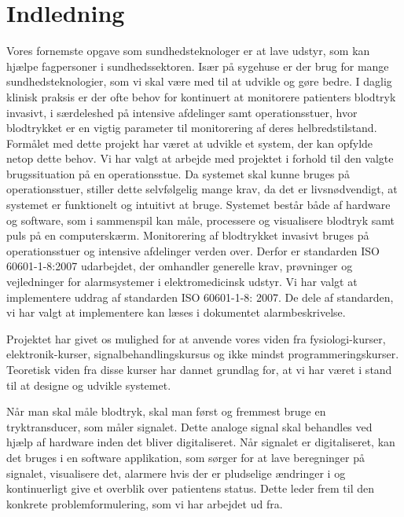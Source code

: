\chapter{Indledning}
Vores fornemste opgave som sundhedsteknologer er at lave udstyr, som kan hjælpe fagpersoner
i sundhedssektoren. Især på sygehuse er der brug for mange sundhedsteknologier, som vi
skal være med til at udvikle og gøre bedre. I daglig klinisk praksis er der ofte behov for
kontinuert at monitorere patienters blodtryk invasivt, i særdeleshed på intensive afdelinger
samt operationsstuer, hvor blodtrykket er en vigtig parameter til monitorering af deres
helbredstilstand. Formålet med dette projekt har været at udvikle et system, der kan opfylde
netop dette behov. Vi har valgt at arbejde med projektet i forhold til den valgte brugssituation
på en operationsstue. Da systemet skal kunne bruges på operationsstuer, stiller dette selvfølgelig
mange krav, da det er livsnødvendigt, at systemet er funktionelt og intuitivt at bruge. Systemet
består både af hardware og software, som i sammenspil kan måle, processere og visualisere blodtryk
samt puls på en computerskærm. Monitorering af blodtrykket invasivt bruges på operationsstuer
og intensive afdelinger verden over. Derfor er standarden ISO 60601-1-8:2007 udarbejdet, der omhandler generelle krav, prøvninger og vejledninger for alarmsystemer i elektromedicinsk udstyr. 
Vi har valgt at implementere uddrag af standarden ISO 60601-1-8: 2007. De dele af standarden, vi har valgt at implementere kan læses i dokumentet alarmbeskrivelse. 

Projektet har givet os mulighed for at anvende vores viden fra fysiologi-kurser, elektronik-kurser,
signalbehandlingskursus og ikke mindst programmeringskurser. Teoretisk viden fra disse kurser
har dannet grundlag for, at vi har været i stand til at designe og udvikle systemet.

Når man skal måle blodtryk, skal man først og fremmest bruge en tryktransducer, som
måler signalet. Dette analoge signal skal behandles ved hjælp af hardware inden det bliver
digitaliseret. Når signalet er digitaliseret, kan det bruges i en software applikation, som sørger
for at lave beregninger på signalet, visualisere det, alarmere hvis der er pludselige ændringer
i og kontinuerligt give et overblik over patientens status. Dette leder frem til den konkrete
problemformulering, som vi har arbejdet ud fra.




